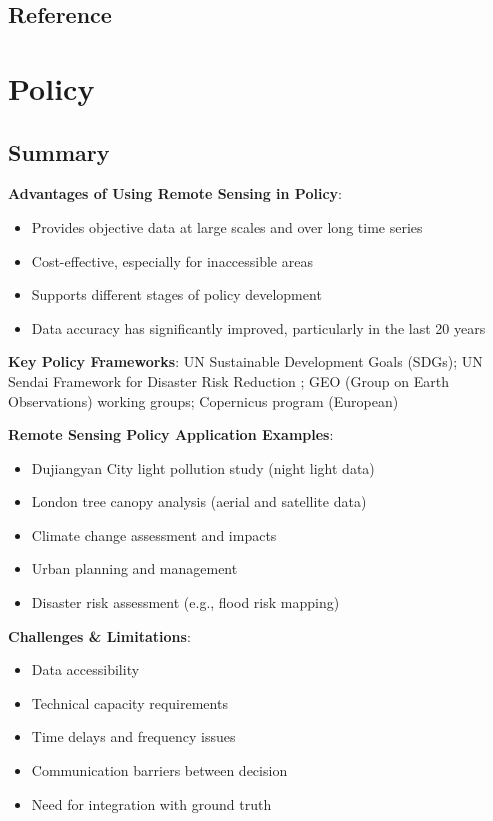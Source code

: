 \documentclass[
  letterpaper,
]{scrbook}
\begin{document}
\section{Reference}\label{reference-1}


\chapter{Policy}\label{policy}

\section{Summary}\label{summary-1}

\textbf{Advantages of Using Remote Sensing in Policy}:

\begin{itemize}
\item
  Provides objective data at large scales and over long time series
\item
  Cost-effective, especially for inaccessible areas
\item
  Supports different stages of policy development
\item
  Data accuracy has significantly improved, particularly in the last 20
  years
\end{itemize}

\textbf{Key Policy Frameworks}: UN Sustainable Development Goals (SDGs);
UN Sendai Framework for Disaster Risk Reduction ; GEO (Group on Earth
Observations) working groups; Copernicus program (European)

\textbf{Remote Sensing Policy Application Examples}:

\begin{itemize}
\item
  Dujiangyan City light pollution study (night light data)
\item
  London tree canopy analysis (aerial and satellite data)
\item
  Climate change assessment and impacts
\item
  Urban planning and management
\item
  Disaster risk assessment (e.g., flood risk mapping)
\end{itemize}

\textbf{Challenges \& Limitations}:

\begin{itemize}
\item
  Data accessibility
\item
  Technical capacity requirements
\item
  Time delays and frequency issues
\item
  Communication barriers between decision
\item
  Need for integration with ground truth
\end{itemize}
\end{document}
